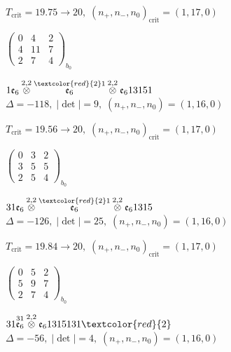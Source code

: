 \documentclass[10pt]{article}
\begin{document}
\hspace{1em}$T_{\text{crit}}=19.75 \to 20,\; (n_+,n_-,n_0)_{\text{crit}}=(1,17,0)$

\hspace{2em}$\left(\begin{smallmatrix}0 & 4 & 2 \\ 4 & 11 & 7 \\ 2 & 7 & 4\end{smallmatrix}\right)_{\!b_0}$

\smallskip

$1\mathfrak{e}_6\overset{2,2}{\otimes}\overset{\textcolor{red}{2}1}{\mathfrak{e}_6}\overset{2,2}{\otimes}\mathfrak{e}_613151$ \quad $\Delta=-118,\; |\det|=9,\; (n_+,n_-,n_0)=(1,16,0)$

\hspace{1em}$T_{\text{crit}}=19.56 \to 20,\; (n_+,n_-,n_0)_{\text{crit}}=(1,17,0)$

\hspace{2em}$\left(\begin{smallmatrix}0 & 3 & 2 \\ 3 & 5 & 5 \\ 2 & 5 & 4\end{smallmatrix}\right)_{\!b_0}$

\smallskip

$31\mathfrak{e}_6\overset{2,2}{\otimes}\overset{\textcolor{red}{2}1}{\mathfrak{e}_6}\overset{2,2}{\otimes}\mathfrak{e}_61315$ \quad $\Delta=-126,\; |\det|=25,\; (n_+,n_-,n_0)=(1,16,0)$

\hspace{1em}$T_{\text{crit}}=19.84 \to 20,\; (n_+,n_-,n_0)_{\text{crit}}=(1,17,0)$

\hspace{2em}$\left(\begin{smallmatrix}0 & 5 & 2 \\ 5 & 9 & 7 \\ 2 & 7 & 4\end{smallmatrix}\right)_{\!b_0}$

\smallskip

$31\overset{31}{\mathfrak{e}_6}\overset{2,2}{\otimes}\mathfrak{e}_61315131\textcolor{red}{2}$ \quad $\Delta=-56,\; |\det|=4,\; (n_+,n_-,n_0)=(1,16,0)$
\end{document}
